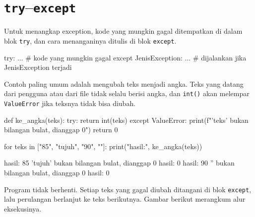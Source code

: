 \section{\texttt{try}--\texttt{except}}

Untuk menangkap exception, kode yang mungkin gagal ditempatkan di dalam blok \texttt{try}, dan cara menanganinya ditulis di blok \texttt{except}.

\begin{kode}
try:
    ...                     # kode yang mungkin gagal
except JenisException:
    ...                     # dijalankan jika JenisException terjadi
\end{kode}

Contoh paling umum adalah mengubah teks menjadi angka. Teks yang datang dari pengguna atau dari file tidak selalu berisi angka, dan \texttt{int()} akan melempar \texttt{ValueError} jika teksnya tidak bisa diubah.

\begin{kode}
def ke_angka(teks):
    try:
        return int(teks)
    except ValueError:
        print(f"'{teks}' bukan bilangan bulat, dianggap 0")
        return 0

for teks in ["85", "tujuh", "90", ""]:
    print("hasil:", ke_angka(teks))
\end{kode}

\begin{keluaran}
hasil: 85
'tujuh' bukan bilangan bulat, dianggap 0
hasil: 0
hasil: 90
'' bukan bilangan bulat, dianggap 0
hasil: 0
\end{keluaran}

Program tidak berhenti. Setiap teks yang gagal diubah ditangani di blok \texttt{except}, lalu perulangan berlanjut ke teks berikutnya. Gambar berikut merangkum alur eksekusinya.

